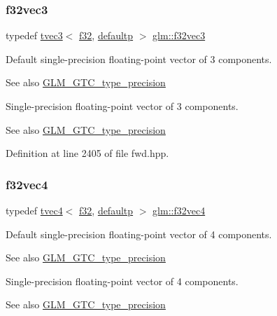 \subsubsection{\texorpdfstring{f32vec3}{f32vec3}}
{\footnotesize\ttfamily typedef \mbox{\hyperlink{structglm_1_1tvec3}{tvec3}}$<$ \mbox{\hyperlink{group__gtc__type__precision_ga0ec999b57f5330d9021256e96038df04}{f32}}, \mbox{\hyperlink{namespaceglm_a0f04f086094c747d227af4425893f545a9d21ccd8b5a009ec7eb7677befc3bf51}{defaultp}} $>$ \mbox{\hyperlink{group__gtc__type__precision_gab550330e62a7bc3fa9e6740b9421037c}{glm\+::f32vec3}}}

Default single-\/precision floating-\/point vector of 3 components. \begin{DoxySeeAlso}{See also}
\mbox{\hyperlink{group__gtc__type__precision}{G\+L\+M\+\_\+\+G\+T\+C\+\_\+type\+\_\+precision}}
\end{DoxySeeAlso}
Single-\/precision floating-\/point vector of 3 components. \begin{DoxySeeAlso}{See also}
\mbox{\hyperlink{group__gtc__type__precision}{G\+L\+M\+\_\+\+G\+T\+C\+\_\+type\+\_\+precision}} 
\end{DoxySeeAlso}


Definition at line 2405 of file fwd.\+hpp.

\mbox{\label{group__gtc__type__precision_ga6848e3b5cb5c1f4c117717b309e726eb}} 
\subsubsection{\texorpdfstring{f32vec4}{f32vec4}}
{\footnotesize\ttfamily typedef \mbox{\hyperlink{structglm_1_1tvec4}{tvec4}}$<$ \mbox{\hyperlink{group__gtc__type__precision_ga0ec999b57f5330d9021256e96038df04}{f32}}, \mbox{\hyperlink{namespaceglm_a0f04f086094c747d227af4425893f545a9d21ccd8b5a009ec7eb7677befc3bf51}{defaultp}} $>$ \mbox{\hyperlink{group__gtc__type__precision_ga6848e3b5cb5c1f4c117717b309e726eb}{glm\+::f32vec4}}}

Default single-\/precision floating-\/point vector of 4 components. \begin{DoxySeeAlso}{See also}
\mbox{\hyperlink{group__gtc__type__precision}{G\+L\+M\+\_\+\+G\+T\+C\+\_\+type\+\_\+precision}}
\end{DoxySeeAlso}
Single-\/precision floating-\/point vector of 4 components. \begin{DoxySeeAlso}{See also}
\mbox{\hyperlink{group__gtc__type__precision}{G\+L\+M\+\_\+\+G\+T\+C\+\_\+type\+\_\+precision}} 
\end{DoxySeeAlso}


